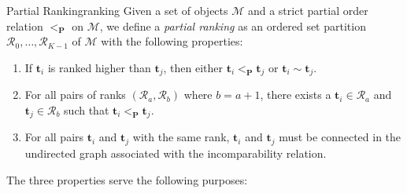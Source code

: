 \documentclass[acmsmall,screen, review]{acmart}
\begin{document}
\begin{mydef}{Partial Ranking}{ranking}
	Given a set of objects $\mathcal{M}$ and a strict partial order relation $<_{\mathbf{P}} $ on $\mathcal{M}$, we define a \textit{partial ranking} as an ordered set partition $\mathcal{R}_0, \dots, \mathcal{R}_{K-1}$ of $\mathcal{M}$ with the following properties: 
	
	\begin{enumerate}
		\setlength\itemsep{0.5em}
		
		
		\item   If $\mathbf{t}_i$ is ranked higher than $\mathbf{t}_j$, then either $\mathbf{t}_i <_{\mathbf{P}}  \mathbf{t}_j$ or $\mathbf{t}_i \sim \mathbf{t}_j$.
		
		\item For all pairs of ranks $(\mathcal{R}_a, \mathcal{R}_b)$ where $b=a+1$, there exists a $\mathbf{t}_i \in \mathcal{R}_a$ and $\mathbf{t}_j \in \mathcal{R}_b$ such that $\mathbf{t}_i <_{\mathbf{P}}  \mathbf{t}_j$.  
		
		
		\item For all pairs $\mathbf{t}_i$ and $\mathbf{t}_j$ with the same rank, $\mathbf{t}_i$ and $\mathbf{t}_j$ must be connected in the undirected graph associated with the incomparability relation. 
		
		
		
	\end{enumerate}
\end{mydef}
\noindent The three properties serve the following purposes:
\end{document}
